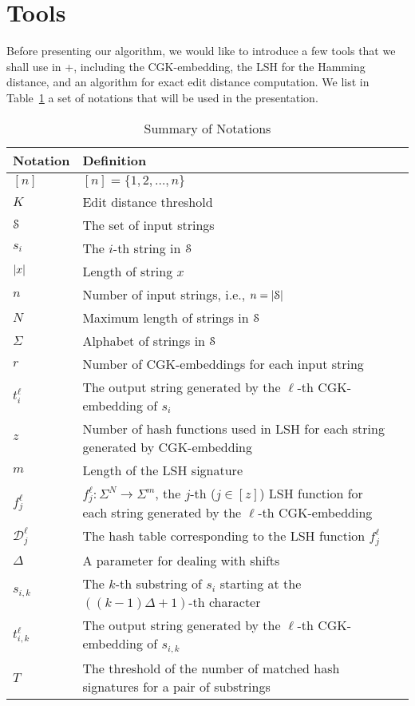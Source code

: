 \section{Tools}
\label{sec:tool}

Before presenting our algorithm, we would like to introduce a few tools that we shall use in \ebdjoin+, including the CGK-embedding, the LSH for the Hamming distance, and an algorithm for exact edit distance computation. We list in Table~\ref{tab:notation} a set of notations that will be used in the presentation.


\begin{table}[t]
\centering
\begin{tabular}{|p{}| p{}| m{}|} 
\hline
Notation & Definition\\ 
\hline
$[n]$ & $[n] = \{1, 2, \ldots, n\}$ \\
\hline
$K$ & Edit distance threshold\\ 
\hline
$\S$ & The set of input strings \\ 
\hline
$s_i$ & The $i$-th string in $\S$ \\ 
\hline
$\abs{x}$ & Length of string $x$ \\ 
\hline
$n$ & Number of input strings, i.e.,  $n = \abs{\S}$\\ 
\hline
$N$ & Maximum length of strings in $\S$\\ 
\hline
$\Sigma$ & Alphabet of strings in $\S$ \\ 
\hline
$r$ & Number of CGK-embeddings for each input string\\ 
\hline
$t_i^{\ell}$ & The output string generated by the $\ell$-th CGK-embedding of $s_i$ \\ 
\hline
$z$ & Number of hash functions used in LSH for each string generated by CGK-embedding\\ 
\hline
$m$ & Length of the LSH signature\\ 
\hline
$f_j^{\ell} $ &   $f_j^{\ell} : \Sigma^N \to \Sigma^m$, the $j$-th ($j\in[z]$)  LSH function for each string generated by the $\ell$-th CGK-embedding
\\ 
\hline
$\mathcal{D}_j^{\ell}$ & The hash table corresponding to the LSH function $f_j^{\ell}$ \\ 
\hline
$\Delta$ & A parameter for dealing with shifts  \\ 
\hline
$s_{i,k}$ & The $k$-th substring of $s_i$ starting at the $((k-1)\Delta+1)$-th character\\ 
\hline
$t_{i,k}^\ell$ & The output string generated by the $\ell$-th CGK-embedding of $s_{i,k}$\\ 
\hline
$T$ & The threshold of the number of matched hash signatures for a pair of substrings\\ 
\hline
\end{tabular}
\caption{Summary of Notations}
\label{tab:notation}
\end{table}



